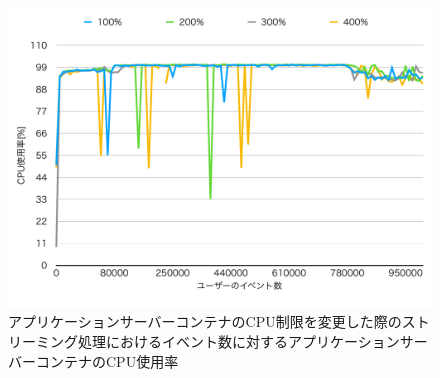 \documentclass[../../../../../main]{subfiles}
\begin{document}
    \begin{figure}[H]
        \centering
        \includegraphics[width=12cm]{graph}
        \caption{アプリケーションサーバーコンテナのCPU制限を変更した際のストリーミング処理におけるイベント数に対するアプリケーションサーバーコンテナのCPU使用率}
        \label{fig:stream-change-cpu-limit-app-cpu-app_1024-db_1_1024}
    \end{figure}
\end{document}

